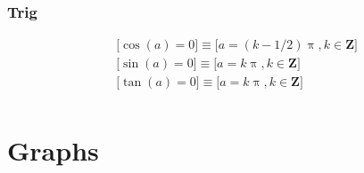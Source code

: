 \documentclass[letterpaper,9pt,fleqn]{extarticle}
\newcommand{\integers}{\mathbf{Z}}
\begin{document}
\begin{multicols*}{3}
\subsubsection*{Trig}
\vspace{-0.2in}
\begin{minipage}[c]{0.1666666666667\textwidth}
\begin{align*}
&\big [\cos(a) = 0 \big ]  \equiv  \big [a =  (k - 1/2)  \uppi, k \in \integers \big ]\\
&\big [\sin(a) = 0 \big ]  \equiv  \big [ a = k \uppi, k \in \integers \big ] \\
&\big [\tan(a) = 0 \big ]  \equiv  \big [ a = k \uppi, k \in \integers \big ] \\
\end{align*}
\end{minipage}

\end{multicols*}


\newpage

\section*{Graphs}
\vspace{-0.2in}
\end{document}
